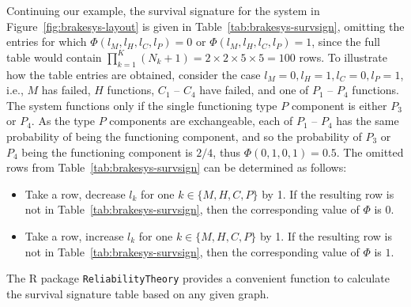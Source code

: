 \documentclass[authoryear]{elsarticle}
\begin{document}
Continuing our example,
the survival signature for the system in Figure~\ref{fig:brakesys-layout} is given in Table~\ref{tab:brakesys-survsign},
omitting the entries for which $\Phi(l_M, l_H, l_C, l_P) = 0$ or $\Phi(l_M, l_H, l_C, l_P) = 1$,
since the full table would contain $\prod_{k=1}^K (N_k + 1) = 2 \times 2 \times 5 \times 5 = 100$ rows.
%
To illustrate how the table entries are obtained,
consider the case $l_M = 0, l_H = 1, l_C = 0, l_P = 1$,
i.e., $M$ has failed, $H$ functions, $C_1$ -- $C_4$ have failed, and one of $P_1$ -- $P_4$ functions.
The system functions only if the single functioning type $P$ component is either $P_3$ or $P_4$.
As the type $P$ components are exchangeable, each of $P_1$ -- $P_4$ has the same probability of being the functioning component,
and so the probability of $P_3$ or $P_4$ being the functioning component is $2 / 4$, thus $\Phi(0, 1, 0, 1) = 0.5$.
%
The omitted rows from Table~\ref{tab:brakesys-survsign} can be determined as follows:
\begin{itemize}
\item Take a row, decrease $l_k$ for one $k \in \{M, H, C, P\}$ by 1.
If the resulting row is not in Table~\ref{tab:brakesys-survsign}, then the corresponding value of $\Phi$ is $0$.
\item Take a row, increase $l_k$ for one $k \in \{M, H, C, P\}$ by 1.
If the resulting row is not in Table~\ref{tab:brakesys-survsign}, then the corresponding value of $\Phi$ is $1$.
\end{itemize} 
The \textsf{R} package \texttt{ReliabilityTheory} \citep{2016:aslett-RT}
provides a convenient function to calculate the survival signature table based on any given graph.
\end{document}
